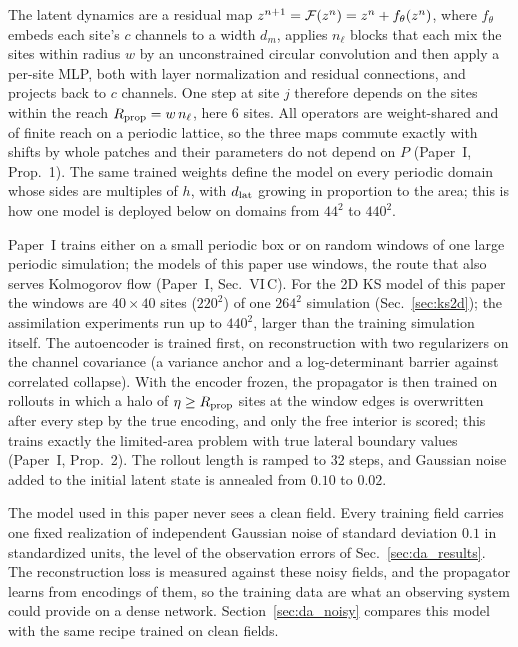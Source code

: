  The latent dynamics are a residual map
$z^{n+1}=\mathcal{F}(z^n)=z^n+f_\theta(z^n)$, where $f_\theta$ embeds each site's
$c$ channels to a width $d_m$, applies $n_\ell$ blocks that each mix the
sites within radius $w$ by an unconstrained circular convolution and then
apply a per-site MLP, both with layer normalization and residual
connections, and projects back to $c$ channels. One step at site $j$
therefore depends on the sites within the reach $R_{\mathrm{prop}}=w\,n_\ell$, here
$6$ sites. All operators are weight-shared and of finite reach on a
periodic lattice, so the three maps commute exactly with shifts by whole
patches and their parameters do not depend on $P$ (Paper~I,
Prop.~1). The same trained weights define the model on every periodic
domain whose sides are multiples of $h$, with $d_{\mathrm{lat}}$ growing in
proportion to the area; this is how one model is deployed below on
domains from $44^2$ to $440^2$.

 Paper~I trains either on a small periodic box or on
random windows of one large periodic simulation; the models of this paper use
windows, the route that also serves Kolmogorov flow (Paper~I, Sec.~VI\,C). For the 2D KS model
of this paper the windows are $40\times40$ sites ($220^2$) of one
$264^2$ simulation (Sec.~\ref{sec:ks2d}); the assimilation experiments
run up to $440^2$, larger than the training simulation itself. The autoencoder is
trained first, on reconstruction with two regularizers on the channel
covariance (a variance anchor and a log-determinant barrier against
correlated collapse). With the encoder frozen, the propagator is then
trained on rollouts in which a halo of $\eta\ge R_{\mathrm{prop}}$ sites at the window
edges is overwritten after every step by the true encoding, and only the
free interior is scored; this trains exactly the limited-area problem with
true lateral boundary values (Paper~I, Prop.~2). The rollout length is
ramped to $32$ steps, and Gaussian noise added to the initial latent state
is annealed from $0.10$ to $0.02$.

 The model used in this paper never sees
a clean field. Every training field carries one fixed realization of
independent Gaussian noise of standard deviation $0.1$ in standardized
units, the level of the observation errors of Sec.~\ref{sec:da_results}.
The reconstruction loss is measured against these noisy fields, and the
propagator learns from encodings of them, so the training data are what an
observing system could provide on a dense network. Section~\ref{sec:da_noisy}
compares this model with the same recipe trained on clean fields.

